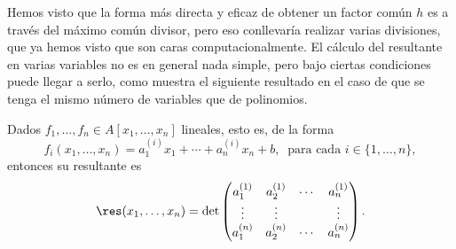 Hemos visto que la forma más directa y eficaz de obtener un factor común $h$ es a través del máximo común divisor, pero eso conllevaría realizar varias divisiones, que ya hemos visto que son caras computacionalmente. El cálculo del resultante en varias variables no es en general nada simple, pero bajo ciertas condiciones puede llegar a serlo, como muestra el siguiente resultado en el caso de que se tenga el mismo número de variables que de polinomios.
\begin{teorema}\label{t:elimRes}
    Dados $f_1,\dots, f_n \in A[x_1,\dots, x_n]$ lineales, esto es, de la forma 
    $$f_i(x_1,\dots, x_n) = a_1^{(i)}x_1 + \cdots + a_n^{(i)}x_n + b,\ \text{ para cada } i\in \{1,\dots, n\},$$
    entonces su resultante es
    $$\res(x_1,\dots, x_n) = \det\begin{pmatrix}
        a_1^{(1)} & a_2^{(1)} & \cdots & a_n^{(1)} \\
        \vdots    & \vdots & &\vdots\\
        a_1^{(n)} & a_2^{(n)} & \cdots & a_n^{(n)}
    \end{pmatrix}.$$
\end{teorema}

